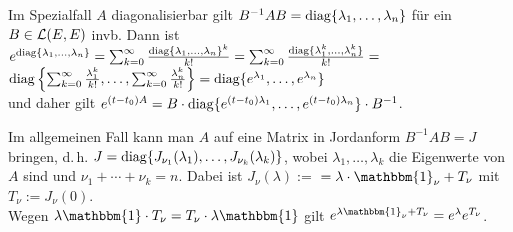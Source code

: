 Im Spezialfall $A$ diagonalisierbar gilt
$B^{-1} A B = \operatorname{diag}\{\lambda_1, \dotsc, \lambda_n\}$
für ein $B \in \mathcal{L}(E, E)$ invb.
Dann ist
$e^{\operatorname{diag}\{\lambda_1, \dotsc, \lambda_n\}} =
\sum_{k=0}^\infty \frac{\operatorname{diag}\{\lambda_1, \dotsc, \lambda_n\}^k}{k!} =
\sum_{k=0}^\infty \frac{\operatorname{diag}\{\lambda_1^k, \dotsc, \lambda_n^k\}}{k!} =$ \\
$\operatorname{diag}\left\{\sum_{k=0}^\infty \frac{\lambda_1^k}{k!}, \dotsc,
\sum_{k=0}^\infty \frac{\lambda_n^k}{k!}\right\} =
\operatorname{diag}\{e^{\lambda_1}, \dotsc, e^{\lambda_n}\}$ \\
und daher gilt
$e^{(t - t_0) A} =
B \cdot \operatorname{diag}\{e^{(t - t_0) \lambda_1}, \dotsc,
e^{(t - t_0) \lambda_n}\} \cdot B^{-1}$.

Im allgemeinen Fall kann man $A$ auf eine Matrix in Jordanform
$B^{-1} A B = J$ bringen, d.\,h.
$J = \operatorname{diag}\{J_{\nu_1}(\lambda_1), \dotsc, J_{\nu_k}(\lambda_k)\}$,
wobei $\lambda_1, \dotsc, \lambda_k$ die Eigenwerte von $A$ sind
und $\nu_1 + \dotsb + \nu_k = n$.
Dabei ist $J_\nu(\lambda) := $  $ = \lambda \cdot \mathbbm{1}_\nu + T_\nu$ mit
$T_\nu := J_\nu(0)$. \\
Wegen $\lambda \mathbbm{1} \cdot T_\nu = T_\nu \cdot \lambda \mathbbm{1}$
gilt $e^{\lambda \mathbbm{1}_\nu + T_\nu} = e^\lambda e^{T_\nu}$.

